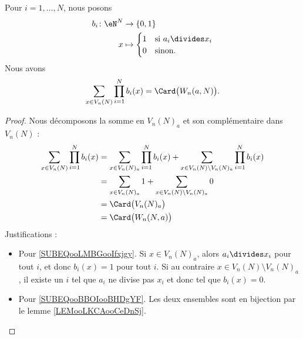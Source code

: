 \begin{lemma}       \label{LEMooOPXHooHzoHrm}
	Pour \( i=1,\ldots, N\), nous posons
	\begin{equation}
		\begin{aligned}
			b_i\colon \eN^N & \to \{ 0,1 \}                          \\
			x               & \mapsto \begin{cases}
				                          1 & \text{si } a_i\divides x_i \\
				                          0 & \text{sinon. }
			                          \end{cases}
		\end{aligned}
	\end{equation}
	Nous avons
	\begin{equation}
		\sum_{x\in V_n(N)}\prod_{i=1}^Nb_i(x)=\Card\big( W_n(a,N) \big).
	\end{equation}
\end{lemma}

\begin{proof}
	Nous décomposons la somme en \( V_n(N)_a\) et son complémentaire dans \( V_n(N)\) :
	\begin{subequations}
		\begin{align}
			\sum_{x\in V_n(N)}\prod_{i=1}^Nb_i(x) & =\sum_{x\in V_n(N)_a}\prod_{i=1}^Nb_i(x)+\sum_{x\in V_n(N)\setminus V_n(N)_a}\prod_{i=1}^Nb_i(x) \\
			                                      & =\sum_{x\in V_n(N)_a}1+\sum_{x\in V_n(N)\setminus V_n(N)_a}0       \label{SUBEQooLMBGooIfxjgy}   \\
			                                      & =\Card\big( V_n(N)_a \big)                                                                       \\
			                                      & =\Card\big( W_n(N,a) \big)     \label{SUBEQooBBOIooBHDgYF}
		\end{align}
	\end{subequations}
	Justifications :
	\begin{itemize}
		\item Pour \eqref{SUBEQooLMBGooIfxjgy}.
		      Si \( x\in V_n(N)_a\), alors \( a_i\divides x_i\) pour tout \( i\), et donc \( b_i(x)=1\) pour tout \( i\). Si au contraire \( x\in V_n(N)\setminus V_n(N)_a\), il existe un \( i\) tel que \( a_i\) ne divise pas \( x_i\) et donc tel que \( b_i(x)=0\).
		\item Pour \eqref{SUBEQooBBOIooBHDgYF}. Les deux ensembles sont en bijection par le lemme \ref{LEMooLKCAooCeDnSj}.
	\end{itemize}
\end{proof}

